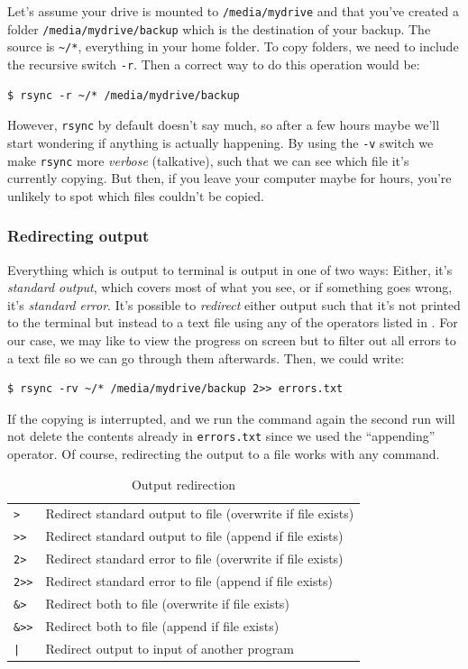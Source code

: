 Let's assume your drive is mounted to \verb|/media/mydrive| and that you've created a folder \verb|/media/mydrive/backup| which is the destination of your backup. The source is \verb|~/*|, everything in your home folder. To copy folders, we need to include the recursive switch \verb|-r|. Then a correct way to do this operation would be:

\begin{verbatim}
$ rsync -r ~/* /media/mydrive/backup
\end{verbatim}
However, \verb|rsync| by default doesn't say much, so after a few hours maybe we'll start wondering if anything is actually happening. By using the \verb|-v| switch we make \verb|rsync| more \emph{verbose} (talkative), such that we can see which file it's currently copying. But then, if you leave your computer maybe for hours, you're unlikely to spot which files couldn't be copied.

\subsubsection{Redirecting output}
Everything which is output to terminal is output in one of two ways: Either, it's \emph{standard output}, which covers most of what you see, or if something goes wrong, it's \emph{standard error}. It's possible to \emph{redirect} either output such that it's not printed to the terminal but instead to a text file using any of the operators listed in . For our case, we may like to view the progress on screen but to filter out all errors to a text file so we can go through them afterwards. Then, we could write:

\begin{verbatim}
$ rsync -rv ~/* /media/mydrive/backup 2>> errors.txt
\end{verbatim}
If the copying is interrupted, and we run the command again the second run will not delete the contents already in \verb|errors.txt| since we used the ``appending'' operator. Of course, redirecting the output to a file works with any command.

\begin{table}
	\centering
	\caption{Output redirection}
	\begin{tabular}{ll}
	\hline
	\verb|>|		& Redirect standard output to file (overwrite if file exists)	\\
	\verb|>>|	& Redirect standard output to file (append if file exists)	\\
	\verb|2>|	& Redirect standard error to file	 (overwrite if file exists)	\\
	\verb|2>>|	& Redirect standard error to file	(append if file exists)	\\
	\verb|&>|	& Redirect both to file (overwrite if file exists) \\
	\verb|&>>|	& Redirect both to file (append if file exists) \\
	\verb$|$		& Redirect output to input of another program \\
	\end{tabular}
	\label{tab:bash:redirection}
\end{table}

